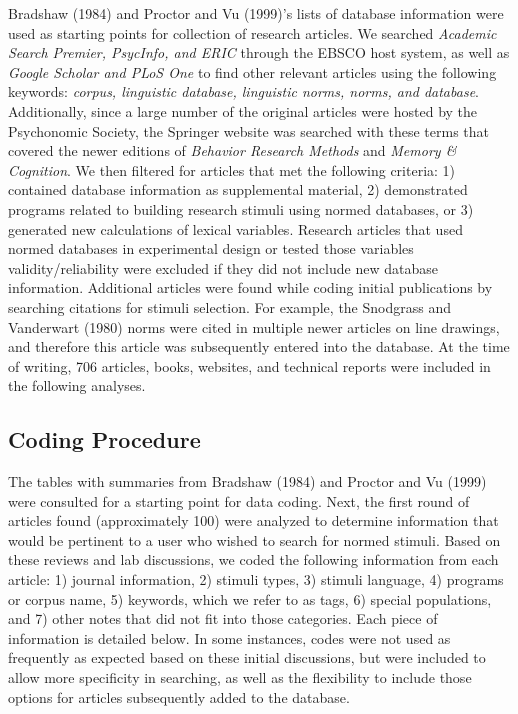 \documentclass[english,man]{apa6}
\theoremstyle{definition}
\theoremstyle{definition}
\theoremstyle{definition}
\theoremstyle{remark}
\begin{document}
Bradshaw (1984) and Proctor and Vu (1999)'s lists of database
information were used as starting points for collection of research
articles. We searched \emph{Academic Search Premier, PsycInfo, and ERIC}
through the EBSCO host system, as well as \emph{Google Scholar and PLoS
One} to find other relevant articles using the following keywords:
\emph{corpus, linguistic database, linguistic norms, norms, and
database}. Additionally, since a large number of the original articles
were hosted by the Psychonomic Society, the Springer website was
searched with these terms that covered the newer editions of
\emph{Behavior Research Methods} and \emph{Memory \& Cognition}. We then
filtered for articles that met the following criteria: 1) contained
database information as supplemental material, 2) demonstrated programs
related to building research stimuli using normed databases, or 3)
generated new calculations of lexical variables. Research articles that
used normed databases in experimental design or tested those variables
validity/reliability were excluded if they did not include new database
information. Additional articles were found while coding initial
publications by searching citations for stimuli selection. For example,
the Snodgrass and Vanderwart (1980) norms were cited in multiple newer
articles on line drawings, and therefore this article was subsequently
entered into the database. At the time of writing, 706 articles, books,
websites, and technical reports were included in the following analyses.

\subsection{Coding Procedure}\label{coding-procedure}

The tables with summaries from Bradshaw (1984) and Proctor and Vu (1999)
were consulted for a starting point for data coding. Next, the first
round of articles found (approximately 100) were analyzed to determine
information that would be pertinent to a user who wished to search for
normed stimuli. Based on these reviews and lab discussions, we coded the
following information from each article: 1) journal information, 2)
stimuli types, 3) stimuli language, 4) programs or corpus name, 5)
keywords, which we refer to as tags, 6) special populations, and 7)
other notes that did not fit into those categories. Each piece of
information is detailed below. In some instances, codes were not used as
frequently as expected based on these initial discussions, but were
included to allow more specificity in searching, as well as the
flexibility to include those options for articles subsequently added to
the database.
\end{document}
